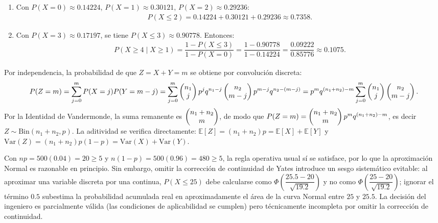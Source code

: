 \begin{solproblema}[prob:c3d2032]
	\begin{enumerate}
		\item Con $P(X=0)\approx0.14224$, $P(X=1)\approx0.30121$, $P(X=2)\approx0.29236$:
		\begin{align*}
			P(X\le2) = 0.14224+0.30121+0.29236 \approx 0.7358.
		\end{align*}
		\item Con $P(X=3)\approx0.17197$, se tiene $P(X\le3)\approx0.90778$. Entonces:
		\begin{align*}
			P(X\ge4\mid X\ge1) = \dfrac{1-P(X\le3)}{1-P(X=0)} = \dfrac{1-0.90778}{1-0.14224} = \dfrac{0.09222}{0.85776}\approx0.1075.
		\end{align*}
	\end{enumerate}
\end{solproblema}

\begin{solproblema}
	Por independencia, la probabilidad de que $Z=X+Y=m$ se obtiene por convolución discreta:
	\begin{align*}
		P(Z=m) = \sum_{j=0}^m P(X=j)P(Y=m-j) = \sum_{j=0}^m \begin{pmatrix} n_1 \\ j\end{pmatrix}p^j q^{n_1-j} \begin{pmatrix} n_2 \\ m-j\end{pmatrix}p^{m-j}q^{n_2-(m-j)} = p^m q^{(n_1+n_2)-m}\sum_{j=0}^m \begin{pmatrix} n_1 \\ j\end{pmatrix}\begin{pmatrix} n_2 \\ m-j\end{pmatrix}.
	\end{align*}
	Por la Identidad de Vandermonde, la suma remanente es $\begin{pmatrix} n_1+n_2 \\ m\end{pmatrix}$, de modo que $P(Z=m) = \begin{pmatrix} n_1+n_2 \\ m\end{pmatrix}p^m q^{(n_1+n_2)-m}$, es decir $Z \sim \text{Bin}(n_1+n_2,p)$. La aditividad se verifica directamente: $\mathbb{E}[Z]=(n_1+n_2)p=\mathbb{E}[X]+\mathbb{E}[Y]$ y $\text{Var}(Z)=(n_1+n_2)p(1-p)=\text{Var}(X)+\text{Var}(Y)$.
\end{solproblema}

\begin{solproblema}[prob:19f50da]
	Con $np = 500(0.04) = 20 \ge 5$ y $n(1-p) = 500(0.96) = 480 \ge 5$, la regla operativa usual sí se satisface, por lo que la aproximación Normal es razonable en principio. Sin embargo, omitir la corrección de continuidad de Yates introduce un sesgo sistemático evitable: al aproximar una variable discreta por una continua, $P(X \le 25)$ debe calcularse como $\Phi\!\left(\dfrac{25.5-20}{\sqrt{19.2}}\right)$ y no como $\Phi\!\left(\dfrac{25-20}{\sqrt{19.2}}\right)$; ignorar el término $0.5$ subestima la probabilidad acumulada real en aproximadamente el área de la curva Normal entre $25$ y $25.5$. La decisión del ingeniero es parcialmente válida (las condiciones de aplicabilidad se cumplen) pero técnicamente incompleta por omitir la corrección de continuidad.
\end{solproblema}

